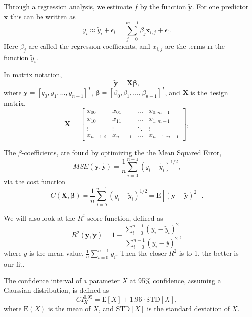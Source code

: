 \documentclass[a4paper,10pt,english]{article}
\begin{document}
Through a regression analysis, we estimate $f$ by the function $\bm{{\tilde y}}$. For one predictor $\bm{{x}}$ this can be written as
\begin{equation}
y_i \approx \tilde y_i + \epsilon_i = \sum_{j=0}^{m-1}\beta_j \bm{{x}}_{i,j} + \epsilon_i.
\end{equation}
Here $\beta_j$ are called the regression coefficients, and $x_{i,j}$ are the terms in the function $\tilde y_i$.

In matrix notation,
\begin{equation}\label{eq:y_tilde}
\bm{{\tilde y}} = \bm{{X}}\bm{{\beta}},
\end{equation}
where $\bm{{y}}=[y_0, y_1, \dots, y_{n-1}]^{T}$, $\bm{{\beta}}=[\beta_0, \beta_1, \dots, \beta_{n-1}]^{T}$, and $\bm{{X}}$ is the design matrix,
\begin{equation}\label{eq:design_matrix}
\bm{{X}}=
\begin{bmatrix}
x_{00} & x_{01} & \dots   & x_{0,m-1} \\
x_{10} & x_{11} & \dots   & x_{1,m-1} \\
\vdots & \vdots & \ddots  & \vdots \\
x_{n-1,0} & x_{n-1,1} & \dots   & x_{n-1,m-1}
\end{bmatrix},
\end{equation}

The $\beta$-coefficients, are found by optimizing the the Mean Squared Error,
\begin{equation}
MSE(\bm{{y}},\bm{{\tilde y}}) = \frac{1}{n}\sum^{n-1}_{i=0}(y_i-\tilde y_i)^{1/2},
\end{equation}
via the cost function
\begin{equation}
C(\bm{{X}},\bm{{\beta}}) = \frac{1}{n}\sum^{n-1}_{i=0}(y_i-\tilde y_i)^{1/2} = \mathrm{E}[(\bm{{y}}-\bm{{\tilde y}})^2].
\end{equation}

We will also look at the $R^2$ score function, defined as
\begin{equation}
R^2(\bm{{y}},\bm{{\tilde y}})= 1 - \frac{\sum_{i=0}^{n-1}(y_i-\tilde y_i)^2}{\sum_{i=0}^{n-1}(y_i- \bar y)^2},
\end{equation}
where $\bar y$ is the mean value, $\frac{1}{n}\sum^{n-1}_{i=0}y_i$. Then the closer $R^2$ is to 1, the better is our fit.

The confidence interval of a parameter $X$ at 95\% confidence, assuming a Gaussian distribution, is defined as
\begin{equation}
CI_{X}^{0.95} = \mathrm{E}[X] \pm 1.96\cdot \mathrm{STD}[X],
\end{equation}
where $\mathrm{E}(X)$ is the mean of $X$, and $\mathrm{STD}[X]$ is the standard deviation of $X$.
\end{document}
